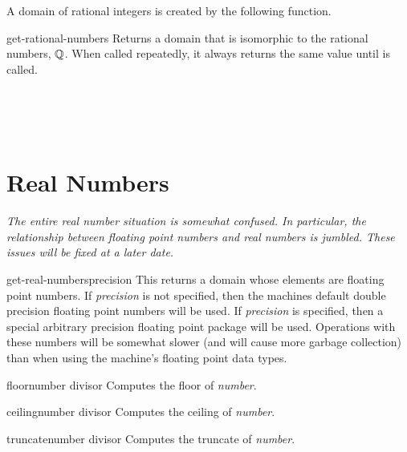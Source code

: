 A domain of rational integers is created by the following function.

\begin{functiondef}{get-rational-numbers}{}
Returns a domain that is isomorphic to the rational numbers, ${\Bbb Q}$.  When
called repeatedly, it always returns the same value until
 is called. 
\end{functiondef}


\medskip
\begin{flushleft}
  \\
 \\
 \\
\end{flushleft}


\section{Real Numbers}
\label{Real:Numbers:Sec}

{\em The entire real number situation is somewhat confused.  In
particular, the relationship between floating point numbers and real
numbers is jumbled.  These issues will be fixed at a later date. }

\begin{functiondef}{get-real-numbers}{\optional{}precision}
This returns a domain whose elements are floating point numbers.  If
{\em precision} is not specified, then the machines default double
precision floating point numbers will be used.  If {\em precision} is
specified, then a special arbitrary precision floating point package
will be used.  Operations with these numbers will be somewhat slower
(and will cause more garbage collection) than when using the machine's
floating point data types.
\end{functiondef}

\begin{functiondef}{floor}{number \optional {} divisor}
Computes the floor of {\em number}.
\end{functiondef}

\begin{functiondef}{ceiling}{number \optional {} divisor}
Computes the ceiling of {\em number}.
\end{functiondef}

\begin{functiondef}{truncate}{number \optional {} divisor}
Computes the truncate of {\em number}.
\end{functiondef}


